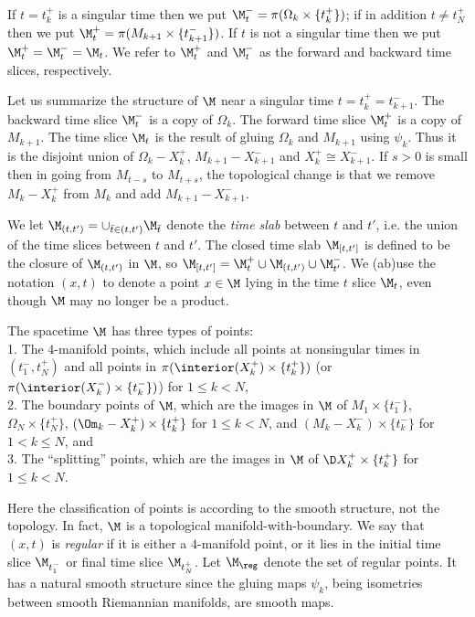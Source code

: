 If $t=t_k^+$ is a singular time then we put
$\M_t^-=\pi(\Omega_k\times\{t_k^+\})$;  if in addition $t\neq t_N^+$ then
we put $\M_t^+=\pi(M_{k+1}\times\{t_{k+1}^-\})$. If $t$ is not a singular time
then we put  $\M_t^+=\M_t^-=\M_t$. We refer to
$\M_t^+$ and $\M_t^-$ as the forward and backward time
slices, respectively.

Let us summarize the structure of $\M$ near a singular time $t = t_k^+ = t_{k+1}^-$.
The backward time slice $\M_t^-$ is a copy of $\Omega_k$. The forward
time slice $\M_t^+$ is a copy of $M_{k+1}$. The time slice
$\M_t$ is the result of gluing $\Omega_k$ and $M_{k+1}$ using $\psi_k$.
Thus it is the disjoint union of $\Omega_k - X_k^+$, $M_{k+1} - X_{k+1}^-$ and
$X_k^+ \cong X_{k+1}^-$.  If $s > 0$ is small then in going from $M_{t-s}$ to
$M_{t+s}$, the topological change is that we remove
$M_k - X_k^+$ from $M_k$ and add $M_{k+1} - X_{k+1}^-$.

We let $\M_{(t,t')} = \cup_{\bar t\in(t,t')} \M_{\bar t}$ denote
the  {\em time slab} between $t$ and $t'$, i.e.
the union of the time slices between $t$ and $t'$.
The closed time
slab $\M_{[t,t']}$ is defined to be the closure of $\M_{(t,t')}$
in $\M$, so $\M_{[t,t']}=\M_t^+\cup\M_{(t,t')}\cup \M_{t'}^-$.
We  (ab)use  the notation
$(x,t)$ to denote a point $x\in\M$ lying in the time $t$ slice $\M_t$,
even though
$\M$ may no longer be a product.

The spacetime $\M$
has three types of points:  \\
1. The  $4$-manifold
points, which include all points at
nonsingular times in
$(t^-_1, t^+_N)$ and all
points in $\pi(\interior(X_k^+)\times \{t_k^+\})$
(or $\pi(\interior(X_{k}^-)\times \{t_{k}^-\})$) for $1 \le k < N$,
\\
2. The boundary points of $\M$, which are the images in $\M$ of
$M_1\times \{t_1^-\}$,
$\Omega_N \times \{t^+_N\}$,
$(\Om_k - X_k^+)\times \{t_k^+\}$ for
$1\leq k<N$, and $(M_k - X_k^-)\times \{t_k^-\}$ for $1<k\leq N$, and \\
3. The ``splitting'' points, which
 are the images in $\M$ of $\D X_k^+\times\{t_k^+\}$
for $1\leq k<N$.

Here the classification of points is according
to the smooth structure, not  the topology. In fact, $\M$ is  a topological
manifold-with-boundary.
We say that $(x,t)$ is {\em regular} if it is either a $4$-manifold
point, or it lies in the initial time slice $\M_{t_1^-}$ or final time slice
$\M_{t_N^+}$.
Let  $\M_{\reg}$ denote the set of regular points. It has a natural
smooth structure since the gluing maps $\psi_k$, being isometries
between smooth Riemannian manifolds, are smooth maps.


